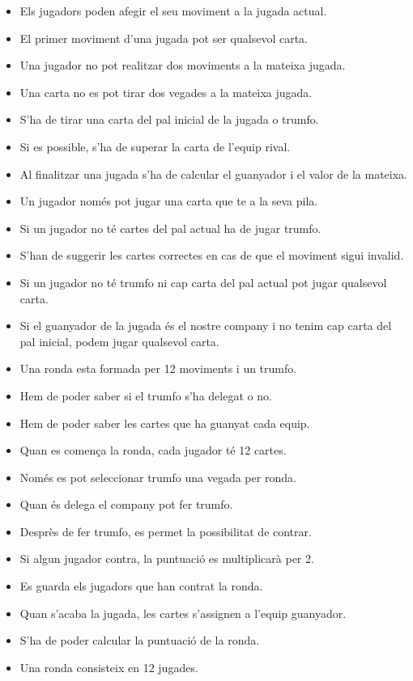 \begin{itemize}
    \item{Els jugadors poden afegir el seu moviment a la jugada actual.}
    \item{El primer moviment d'una jugada pot ser qualsevol carta.}
    \item{Una jugador no pot realitzar dos moviments a la mateixa jugada.}
    \item{Una carta no es pot tirar dos vegades a la mateixa jugada.}
    \item{S'ha de tirar una carta del pal inicial de la jugada o trumfo.}
    \item{Si es possible, s'ha de superar la carta de l'equip rival.}
    \item{Al finalitzar una jugada s'ha de calcular el guanyador i el valor de la mateixa.}
    \item{Un jugador només pot jugar una carta que te a la seva pila.}
    \item{Si un jugador no té cartes del pal actual ha de jugar trumfo.}
    \item{S'han de suggerir les cartes correctes en cas de que el moviment sigui invalid.}
    \item{Si un jugador no té trumfo ni cap carta del pal actual pot jugar qualsevol carta.}
    \item{Si el guanyador de la jugada és el nostre company i no tenim cap carta del pal inicial, podem jugar qualsevol carta.}
    \item{Una ronda esta formada per 12 moviments i un trumfo.}
    \item{Hem de poder saber si el trumfo s'ha delegat o no.}
   \item{Hem de poder saber les cartes que ha guanyat cada equip.}
    \item{Quan es comença la ronda, cada jugador té 12 cartes.}
    \item{Només es pot seleccionar trumfo una vegada per ronda.}
    \item{Quan és delega el company pot fer trumfo.}
    \item{Desprès de fer trumfo, es permet la possibilitat de contrar.}
    \item{Si algun jugador contra, la puntuació es multiplicarà per 2.}
    \item{Es guarda els jugadors que han contrat la ronda.}
    \item{Quan s'acaba la jugada, les cartes s'assignen a l'equip guanyador.}
    \item{S'ha de poder calcular la puntuació de la ronda.}
    \item{Una ronda consisteix en 12 jugades.}
\end{itemize}  

